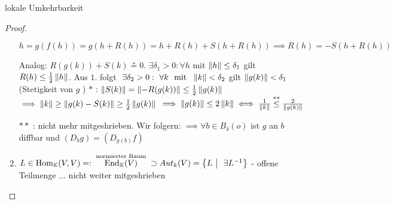 \documentclass[class=article, crop=false]{standalone}
\begin{document}
\begin{zettel}{lokale Umkehrbarkeit}
\begin{proof}
\begin{enumerate}
		      $h = g(f(h)) = g(h + R(h)) = h + R(h) + S(h + R(h)) \implies R(h) = - S(h + R(h))$

		      Analog: $ R (g(k)) + S(k) \stackrel{\ast }{=} 0$. $\exists \delta_1 > 0 : \forall  h $
		      mit $\left\|h\right\| \leq  \delta_1$ gilt $R(h) \leq  \frac{1}{2} \left\|h\right\|$.
		      Aus $1.$ folgt $\exists  \delta_2 > 0 : \forall  k \tx{  mit }  \norm{k} < \delta_2$
		      gilt $\left\|g(k)\right\| < \delta_1$ (Stetigkeit von $g$ )
		      $\ast $ : $ \left\| S(k)\right\| =  \left\|- R(g(k))\right\| \leq  \frac{1}{2} \left\|g(k)\right\|$
		      $ \implies  \left\|k\right\| \geq  \left\|g(k) - S(k)\right\| \geq  \frac{1}{2} \left\|g(k)\right\|$
		      $\implies \left\|g(k)\right\| \leq 2  \left\|k\right\| \iff \frac{1}{\left\|k\right\|} \stackrel{\ast \ast }{\leq} \frac{2}{ \left\|g(k)\right\|}$

		      $\ast  \ast $ : nicht mehr mitgeshrieben. Wir folgern:
		      $\implies  \forall  b \in  B_{\delta}(o)$ ist $g$ an $b$ diffbar und $ (D_b g) = ( D_{g(b)} f )$
		\item $L \in  \Hom_\K(V,V) =: \stackrel{\tx{ normierter Raum } }{\End_ \K (V)} \supset Aut_k(V) = \set{L}{\exists L^{-1}}$ - offene Teilmenge ... nicht weiter mitgeshrieben
	\end{enumerate}

\end{proof}
\end{zettel}
\end{document}
